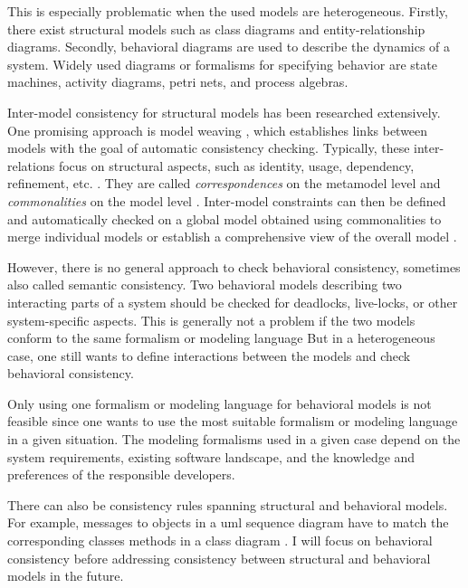 \documentclass[conference]{IEEEtran}
\begin{document}
This is especially problematic when the used models are heterogeneous.
Firstly, there exist structural models such as class diagrams and entity-relationship diagrams.
Secondly, behavioral diagrams are used to describe the dynamics of a system.
Widely used diagrams or formalisms for specifying behavior are state machines, activity diagrams, petri nets, and process algebras.

Inter-model consistency for structural models has been researched extensively.
One promising approach is model weaving \cite{bezivinCanonicalSchemeModel2006}, which establishes links between models with the goal of automatic consistency checking.
Typically, these inter-relations focus on structural aspects, such as identity, usage, dependency, refinement, etc. \cite{feldmannManagingIntermodelInconsistencies2019, torresSystematicLiteratureReview2020}.
They are called \textit{correspondences} on the metamodel level and \textit{commonalities} on the model level \cite{stunkelMultipleModelSynchronization2020, klareCommonalitiesPreservingConsistency2019}.
Inter-model constraints can then be defined and automatically checked on a global model obtained using commonalities to merge individual models \cite{stunkelMultimodelCorrespondenceIntermodel2018} or establish a comprehensive view of the overall model \cite{stunkelMultipleModelSynchronization2020}.

However, there is no general approach to check behavioral consistency, sometimes also called semantic consistency.
Two behavioral models describing two interacting parts of a system should be checked for deadlocks, live-locks, or other system-specific aspects.
This is generally not a problem if the two models conform to the same formalism or modeling language
But in a heterogeneous case, one still wants to define interactions between the models and check behavioral consistency.

Only using one formalism or modeling language for behavioral models is not feasible since one wants to use the most suitable formalism or modeling language in a given situation.
The modeling formalisms used in a given case depend on the system requirements, existing software landscape, and the knowledge and preferences of the responsible developers. 

There can also be consistency rules spanning structural and behavioral models.
For example, messages to objects in a \gls{uml} sequence diagram have to match the corresponding classes methods in a class diagram \cite{egyedFixingInconsistenciesUML2007}.
I will focus on behavioral consistency before addressing consistency between structural and behavioral models in the future. 
\end{document}
